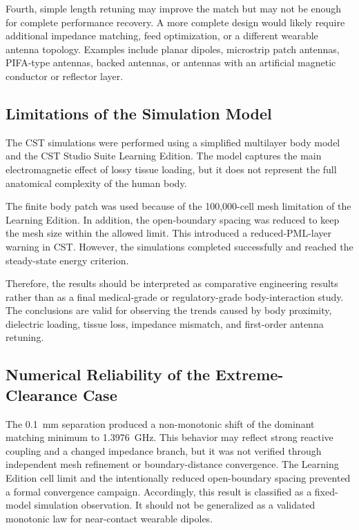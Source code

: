 Fourth, simple length retuning may improve the match but may not be enough for complete performance recovery. A more complete design would likely require additional impedance matching, feed optimization, or a different wearable antenna topology. Examples include planar dipoles, microstrip patch antennas, PIFA-type antennas, backed antennas, or antennas with an artificial magnetic conductor or reflector layer.

\subsection{Limitations of the Simulation Model}

The CST simulations were performed using a simplified multilayer body model and the CST Studio Suite Learning Edition. The model captures the main electromagnetic effect of lossy tissue loading, but it does not represent the full anatomical complexity of the human body.

The finite body patch was used because of the 100,000-cell mesh limitation of the Learning Edition. In addition, the open-boundary spacing was reduced to keep the mesh size within the allowed limit. This introduced a reduced-PML-layer warning in CST. However, the simulations completed successfully and reached the steady-state energy criterion.

Therefore, the results should be interpreted as comparative engineering results rather than as a final medical-grade or regulatory-grade body-interaction study. The conclusions are valid for observing the trends caused by body proximity, dielectric loading, tissue loss, impedance mismatch, and first-order antenna retuning.



\subsection{Numerical Reliability of the Extreme-Clearance Case}

The 0.1~mm separation produced a non-monotonic shift of the dominant matching minimum to 1.3976~GHz. This behavior may reflect strong reactive coupling and a changed impedance branch, but it was not verified through independent mesh refinement or boundary-distance convergence. The Learning Edition cell limit and the intentionally reduced open-boundary spacing prevented a formal convergence campaign. Accordingly, this result is classified as a fixed-model simulation observation. It should not be generalized as a validated monotonic law for near-contact wearable dipoles.

